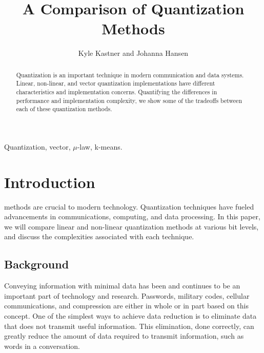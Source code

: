 \documentclass[journal]{IEEEtran}
\begin{document}
\title{A Comparison of Quantization Methods}

\author{Kyle Kastner and Johanna Hansen}%

\maketitle

\begin{abstract}
Quantization is an important technique in modern communication and data systems. Linear, non-linear, and vector quantization
implementations have different characteristics and implementation concerns. Quantifying the differences in performance 
and implementation complexity, we show some of the tradeoffs between each of these quantization methods.
\end{abstract}

\begin{IEEEkeywords}
Quantization, vector, $\mu$-law, k-means.
\end{IEEEkeywords}

\IEEEpeerreviewmaketitle
\section{Introduction}
 methods are crucial to modern technology. Quantization techniques have fueled 
advancements in communications, computing, and data processing. In this paper, we will compare linear and non-linear 
quantization methods at various bit levels, and discuss the complexities associated with each technique.

\subsection{Background}
Conveying information with minimal data has been and continues to be an important part of technology and research. Passwords, 
military codes, cellular communications, and compression are either in whole or in part based on this concept. One of the simplest ways
to achieve data reduction is to eliminate data that does not transmit useful information. This elimination, done correctly, can 
greatly reduce the amount of data required to transmit information, such as words in a conversation.
\end{document}
